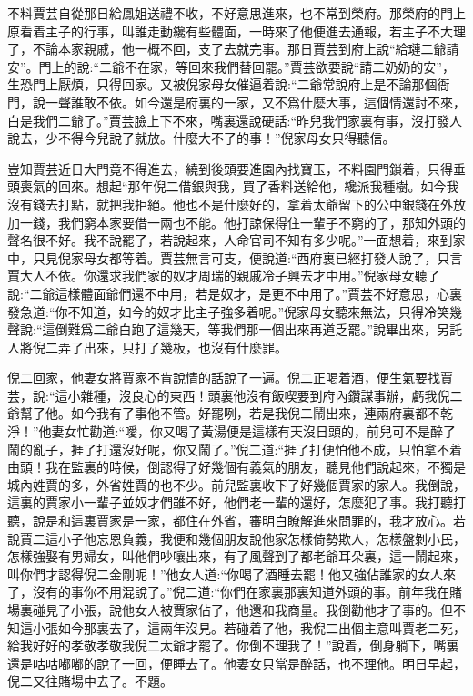 \begin{parag}
    不料賈芸自從那日給鳳姐送禮不收，不好意思進來，也不常到榮府。那榮府的門上原看着主子的行事，叫誰走動纔有些體面，一時來了他便進去通報，若主子不大理了，不論本家親戚，他一概不回，支了去就完事。那日賈芸到府上說“給璉二爺請安”。門上的說:“二爺不在家，等回來我們替回罷。”賈芸欲要說“請二奶奶的安”，生恐門上厭煩，只得回家。又被倪家母女催逼着說:“二爺常說府上是不論那個衙門，說一聲誰敢不依。如今還是府裏的一家，又不爲什麼大事，這個情還討不來，白是我們二爺了。”賈芸臉上下不來，嘴裏還說硬話:“昨兒我們家裏有事，沒打發人說去，少不得今兒說了就放。什麼大不了的事！”倪家母女只得聽信。
\end{parag}


\begin{parag}
    豈知賈芸近日大門竟不得進去，繞到後頭要進園內找寶玉，不料園門鎖着，只得垂頭喪氣的回來。想起“那年倪二借銀與我，買了香料送給他，纔派我種樹。如今我沒有錢去打點，就把我拒絕。他也不是什麼好的，拿着太爺留下的公中銀錢在外放加一錢，我們窮本家要借一兩也不能。他打諒保得住一輩子不窮的了，那知外頭的聲名很不好。我不說罷了，若說起來，人命官司不知有多少呢。”一面想着，來到家中，只見倪家母女都等着。賈芸無言可支，便說道:“西府裏已經打發人說了，只言賈大人不依。你還求我們家的奴才周瑞的親戚冷子興去才中用。”倪家母女聽了說:“二爺這樣體面爺們還不中用，若是奴才，是更不中用了。”賈芸不好意思，心裏發急道:“你不知道，如今的奴才比主子強多着呢。”倪家母女聽來無法，只得冷笑幾聲說:“這倒難爲二爺白跑了這幾天，等我們那一個出來再道乏罷。”說畢出來，另託人將倪二弄了出來，只打了幾板，也沒有什麼罪。
\end{parag}


\begin{parag}
    倪二回家，他妻女將賈家不肯說情的話說了一遍。倪二正喝着酒，便生氣要找賈芸，說:“這小雜種，沒良心的東西！頭裏他沒有飯喫要到府內鑽謀事辦，虧我倪二爺幫了他。如今我有了事他不管。好罷咧，若是我倪二鬧出來，連兩府裏都不乾淨！”他妻女忙勸道:“噯，你又喝了黃湯便是這樣有天沒日頭的，前兒可不是醉了鬧的亂子，捱了打還沒好呢，你又鬧了。”倪二道:“捱了打便怕他不成，只怕拿不着由頭！我在監裏的時候，倒認得了好幾個有義氣的朋友，聽見他們說起來，不獨是城內姓賈的多，外省姓賈的也不少。前兒監裏收下了好幾個賈家的家人。我倒說，這裏的賈家小一輩子並奴才們雖不好，他們老一輩的還好，怎麼犯了事。我打聽打聽，說是和這裏賈家是一家，都住在外省，審明白瞭解進來問罪的，我才放心。若說賈二這小子他忘恩負義，我便和幾個朋友說他家怎樣倚勢欺人，怎樣盤剝小民，怎樣強娶有男婦女，叫他們吵嚷出來，有了風聲到了都老爺耳朵裏，這一鬧起來，叫你們才認得倪二金剛呢！”他女人道:“你喝了酒睡去罷！他又強佔誰家的女人來了，沒有的事你不用混說了。”倪二道:“你們在家裏那裏知道外頭的事。前年我在賭場裏碰見了小張，說他女人被賈家佔了，他還和我商量。我倒勸他才了事的。但不知這小張如今那裏去了，這兩年沒見。若碰着了他，我倪二出個主意叫賈老二死，給我好好的孝敬孝敬我倪二太爺才罷了。你倒不理我了！”說着，倒身躺下，嘴裏還是咕咕嘟嘟的說了一回，便睡去了。他妻女只當是醉話，也不理他。明日早起，倪二又往賭場中去了。不題。
\end{parag}


